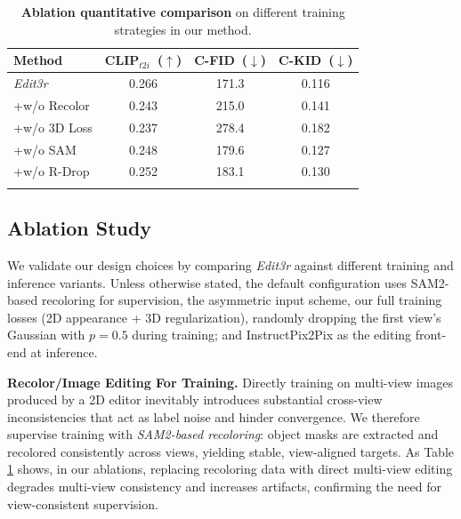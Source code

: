 \documentclass[10pt,twocolumn,letterpaper]{article}
\newcommand{\ourmethod}{\textit{Edit3r}}
\begin{document}
\begin{table}[t]
\centering
\scriptsize
\caption{\textbf{Ablation quantitative comparison} on different training strategies in our method.}
\label{tab:training_ablation}
\setlength{\tabcolsep}{6pt}
\renewcommand{\arraystretch}{1.1}
\begin{tabular}{l@{\hskip 8.0mm}c@{\hskip 8.0mm}c@{\hskip 8.0mm}c}
\toprule
\textbf{Method} & \textbf{CLIP$_{t2i}$~(\(\uparrow\))} &
\textbf{C-FID~(\(\downarrow\))} & \textbf{C-KID~(\(\downarrow\))} \\
\midrule
{\ourmethod}  & 0.266 & 171.3 & 0.116 \\
+w/o Recolor   & 0.243 & 215.0 & 0.141 \\ %
+w/o 3D Loss   & 0.237 & 278.4 & 0.182 \\ %
+w/o SAM  & 0.248 & 179.6 & 0.127 \\ %
+w/o R-Drop & 0.252 & 183.1 & 0.130 \\ %
\bottomrule
\vspace{-4mm}
\end{tabular}
\end{table}

\subsection{Ablation Study}
We validate our design choices by comparing {\ourmethod} against different training and inference variants. Unless otherwise stated, the default configuration uses SAM2-based recoloring for supervision, the asymmetric input scheme, our full training losses (2D appearance + 3D regularization), randomly dropping the first view's Gaussian with $p{=}0.5$ during training; and InstructPix2Pix as the editing front-end at inference.

\vspace{1mm}
\noindent\textbf{Recolor/Image Editing For Training.}
Directly training on multi-view images produced by a 2D editor inevitably introduces substantial cross-view inconsistencies that act as label noise and hinder convergence. We therefore supervise training with \emph{SAM2-based recoloring}: object masks are extracted and recolored consistently across views, yielding stable, view-aligned targets. As Table \ref{tab:training_ablation} shows, in our ablations, replacing recoloring data with direct multi-view editing degrades multi-view consistency and increases artifacts, confirming the need for view-consistent supervision.
\end{document}
